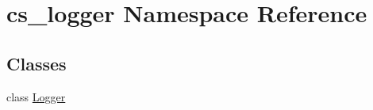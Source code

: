 \hypertarget{namespacecs__logger}{\section{cs\-\_\-logger Namespace Reference}
\label{namespacecs__logger}
}
\subsection*{Classes}
\begin{DoxyCompactItemize}
\item 
class \hyperlink{classcs__logger_1_1Logger}{Logger}
\end{DoxyCompactItemize}
